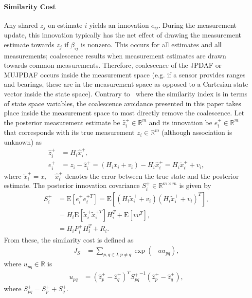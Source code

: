 \documentclass[letterpaper, 10pt, conference]{ieeeconf}
\renewcommand{\Re}{\ensuremath{\mathbb{R}}}
\begin{document}
\paragraph*{Similarity Cost}
Any shared $z_j$ on estimate $i$ yields an innovation $e_{ij}$.
During the measurement update, this innovation typically has the net effect of drawing the measurement estimate towards $z_j$ if $\beta_{ij}$ is nonzero.
This occurs for all estimates and all measurements; coalescence results when measurement estimates are drawn towards common measurements.
Therefore, coalescence of the JPDAF or MUJPDAF occurs inside the measurement space (e.g. if a sensor provides ranges and bearings, these are in the measurement space as opposed to a Cartesian state vector inside the state space).
Contrary to~\cite{KauLovLee14} where the similarity index is in terms of state space variables, the coalescence avoidance presented in this paper takes place inside the measurement space to most directly remove the coalescence.
Let the posterior measurement estimate be $\hat z_i^+\in\Re^m$ and its innovation be $e_{i}^+\in\Re^m$ that corresponds with its true measurement $z_i\in\Re^m$ (although association is unknown) as
\begin{align}
\hat z_i^+&=H_i\hat x_i^+,
\\
e_{i}^+&=z_i-\hat z_i^+=(H_ix_i+v_i)-H_i\hat x_{i}^+=H_i\tilde x_i^++v_i,
\end{align}
where $\tilde x_i^+=x_i-\hat x_{i}^+$ denotes the error between the true state and the posterior estimate. The posterior innovation covariance $S^+_i\in\Re^{m\times m}$ is given by
\begin{align}
S^+_i&=\mathrm{E}[e_i^+e_i^{+T}]=\mathrm{E}[(H_i\tilde x_i^++v_i)(H_i\tilde x_i^++v_i)^T],\nonumber
\\
&=H_i\mathrm{E}[\tilde x_i^+\tilde x_i^{+T}]H_i^T+\mathrm{E}[vv^T],\nonumber
\\
&=H_iP^+_iH_i^T+R_i.
\end{align}
From these, the similarity cost is defined as
\begin{align}
J_S&=\sum\limits_{p,q\in I,p\neq q}\exp (-au_{pq}),
\end{align}
where $u_{pq}\in\Re$ is
\begin{align}
u_{pq} & = (\hat z_{p}^+-\hat z^+_{q})^T{S^+_{pq}}^{-1}(\hat z^+_{p}-\hat z^+_{q})\label{eqn:U},
\end{align}
where $S^+_{pq}=S^+_{p}+S^+_{q}$.
\end{document}

